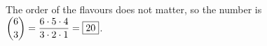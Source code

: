 The order of the flavours does not matter, so the number is $\dbinom63=\dfrac{6\cdot5\cdot4}{3\cdot2\cdot1}=\boxed{20}$.
